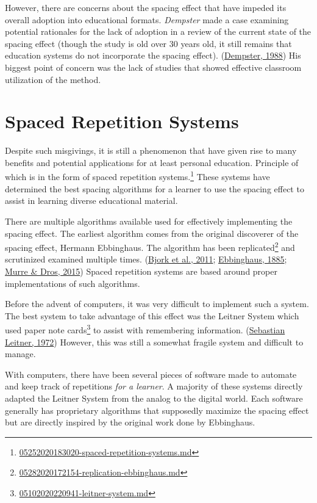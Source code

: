 \documentclass[
  notoc %
]{tufte-book}
\DeclareRobustCommand{\href}[2]{#2\footnote{\url{#1}}}
\begin{document}
However, there are concerns about the spacing effect that have impeded
its overall adoption into educational formats. \emph{Dempster} made a
case examining potential rationales for the lack of adoption in a review
of the current state of the spacing effect (though the study is old over
30 years old, it still remains that education systems do not incorporate
the spacing effect).
(\protect\hyperlink{ref-dempsterCaseStudyFailure1988}{Dempster, 1988})
His biggest point of concern was the lack of studies that showed
effective classroom utilization of the method.

\hypertarget{sec:spaced-repetition-systems}{%
\section{Spaced Repetition
Systems}\label{sec:spaced-repetition-systems}}

Despite such misgivings, it is still a phenomenon that have given rise
to many benefits and potential applications for at least personal
education. Principle of which is in the form of
\href{05252020183020-spaced-repetition-systems.md}{spaced repetition
systems.} These systems have determined the best spacing algorithms for
a learner to use the spacing effect to assist in learning diverse
educational material.

There are multiple algorithms available used for effectively
implementing the spacing effect. The earliest algorithm comes from the
original discoverer of the spacing effect, Hermann Ebbinghaus. The
algorithm \href{05282020172154-replication-ebbinghaus.md}{has been
replicated} and scrutinized examined multiple times.
(\protect\hyperlink{ref-bjork2011making}{Bjork et al., 2011};
\protect\hyperlink{ref-ebbinghaus1885ueber}{Ebbinghaus, 1885};
\protect\hyperlink{ref-murreReplicationAnalysisEbbinghaus2015}{Murre \&
Dros, 2015}) Spaced repetition systems are based around proper
implementations of such algorithms.

Before the advent of computers, it was very difficult to implement such
a system. The best system to take advantage of this effect was the
\href{05102020220941-leitner-system.md}{Leitner System which used paper
note cards} to assist with remembering information.
(\protect\hyperlink{ref-sebastianleitnerLerntManLernen1972}{Sebastian
Leitner, 1972}) However, this was still a somewhat fragile system and
difficult to manage.

With computers, there have been several pieces of software made to
automate and keep track of repetitions \emph{for a learner}. A majority
of these systems directly adapted the Leitner System from the analog to
the digital world. Each software generally has proprietary algorithms
that supposedly maximize the spacing effect but are directly inspired by
the original work done by Ebbinghaus.
\end{document}

